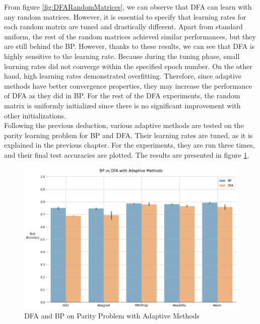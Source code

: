 \documentclass[a4paper, nobind]{templates/ociamthesis}
\begin{document}
\noindent From figure \ref{fig:DFARandomMatrices}, we can observe that DFA can learn with any random matrices. However, it is essential to specify that learning rates for each random matrix are tuned and drastically different. Apart from standard uniform, the rest of the random matrices achieved similar performances, but they are still behind the BP. However, thanks to these results, we can see that DFA is highly sensitive to the learning rate. Because during the tuning phase, small learning rates did not converge within the specified epoch number. On the other hand, high learning rates demonstrated overfitting. Therefore, since adaptive methods have better convergence properties, they may increase the performance of DFA as they did in BP. For the rest of the DFA experiments, the random matrix is uniformly initialized since there is no significant improvement with other initializations.\\
\noindent Following the previous deduction, various adaptive methods are tested on the parity learning problem for BP and DFA. Their learning rates are tuned, as it is explained in the previous chapter. For the experiments, they are run three times, and their final test accuracies are plotted. The results are presented in figure \ref{fig:mainExperiment}.

\begin{figure}

{\centering \includegraphics[width=1\linewidth]{figures/3_mainExperiment} 

}

\caption{DFA and BP on Parity Problem with Adaptive Methods}\label{fig:mainExperiment}
\end{figure}
\end{document}
